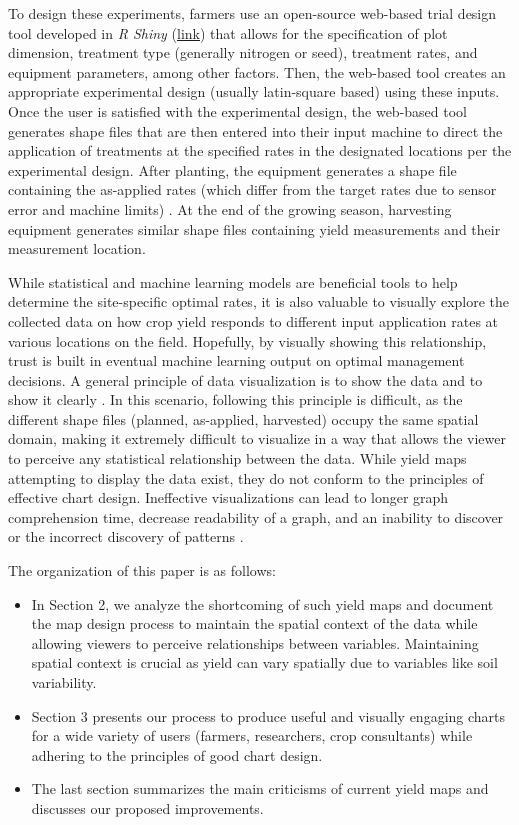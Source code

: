 \documentclass[
  authoryear,
  preprint,
  3p]{elsarticle}
\providecommand{\tightlist}{%
  \setlength{\itemsep}{0pt}\setlength{\parskip}{0pt}}\usepackage{longtable,booktabs,array}
\begin{document}
To design these experiments, farmers use an open-source web-based trial
design tool developed in \emph{R Shiny}
(\href{http://trialdesign.difm-cig.org/}{link}) that allows for the
specification of plot dimension, treatment type (generally nitrogen or
seed), treatment rates, and equipment parameters, among other factors.
Then, the web-based tool creates an appropriate experimental design
(usually latin-square based) using these inputs. Once the user is
satisfied with the experimental design, the web-based tool generates
shape files that are then entered into their input machine to direct the
application of treatments at the specified rates in the designated
locations per the experimental design. After planting, the equipment
generates a shape file containing the as-applied rates (which differ
from the target rates due to sensor error and machine limits)
\citep{trevisan-spatial-2021}. At the end of the growing season,
harvesting equipment generates similar shape files containing yield
measurements and their measurement location.

While statistical and machine learning models are beneficial tools to
help determine the site-specific optimal rates, it is also valuable to
visually explore the collected data on how crop yield responds to
different input application rates at various locations on the field.
Hopefully, by visually showing this relationship, trust is built in
eventual machine learning output on optimal management decisions. A
general principle of data visualization is to show the data and to show
it clearly \citep{gordon_2015}. In this scenario, following this
principle is difficult, as the different shape files (planned,
as-applied, harvested) occupy the same spatial domain, making it
extremely difficult to visualize in a way that allows the viewer to
perceive any statistical relationship between the data. While yield maps
attempting to display the data exist, they do not conform to the
principles of effective chart design. Ineffective visualizations can
lead to longer graph comprehension time, decrease readability of a
graph, and an inability to discover or the incorrect discovery of
patterns \citep{Miller1956TheMN, macdonald_1999, huang2009, lyi2021}.

The organization of this paper is as follows:

\begin{itemize}
\tightlist
\item
  In Section 2, we analyze the shortcoming of such yield maps and
  document the map design process to maintain the spatial context of the
  data while allowing viewers to perceive relationships between
  variables. Maintaining spatial context is crucial as yield can vary
  spatially due to variables like soil variability.
\item
  Section 3 presents our process to produce useful and visually engaging
  charts for a wide variety of users (farmers, researchers, crop
  consultants) while adhering to the principles of good chart design.
\item
  The last section summarizes the main criticisms of current yield maps
  and discusses our proposed improvements.
\end{itemize}
\end{document}
